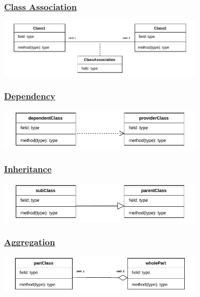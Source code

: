 \subsubsection*{\underline{Class Association}}

\begin{center}
\includegraphics[width=0.75\textwidth]{Chapters/Diagram/OOP/Sum/Class Association/classassoc.drawio.pdf}
\end{center}

\subsubsection*{\underline{Dependency}}

\begin{center}
\includegraphics[width=0.75\textwidth]{Chapters/Diagram/OOP/Sum/Depend/depend.drawio.pdf}
\end{center}

\subsubsection*{\underline{Inheritance}}

\begin{center}
\includegraphics[width=0.75\textwidth]{Chapters/Diagram/OOP/Sum/Inhe/inherit.drawio.pdf}
\end{center}

\subsubsection*{\underline{Aggregation}}

\begin{center}
\includegraphics[width=0.75\textwidth]{Chapters/Diagram/OOP/Sum/Aggrega/aggrega.drawio.pdf}
\end{center}


